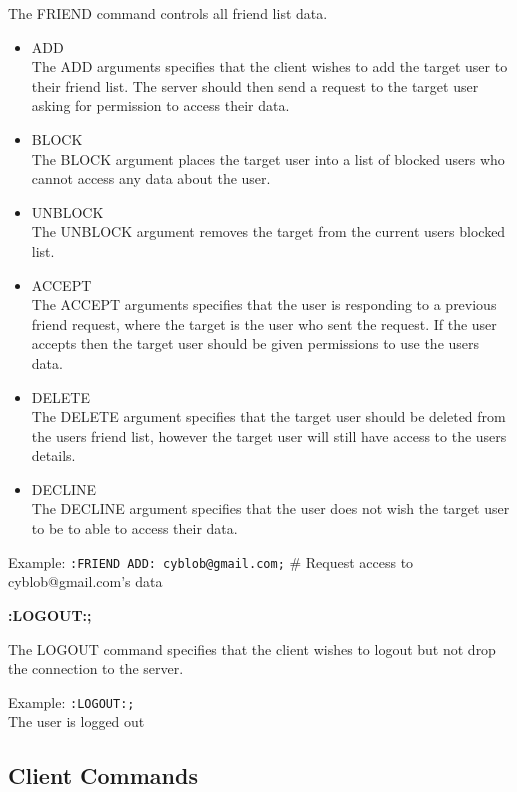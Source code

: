 The FRIEND command controls all friend list data.

\begin{itemize}

\item{ADD \\
The ADD arguments specifies that the client wishes to add the target user to their friend list. The server should then send a request to the target user asking for permission to access their data.}

\item{BLOCK \\
The BLOCK argument places the target user into a list of blocked users who cannot access any data about the user.}

\item{UNBLOCK \\
The UNBLOCK argument removes the target from the current users blocked list.}

\item{ACCEPT \\
The ACCEPT arguments specifies that the user is responding to a previous friend request, where the target is the user who sent the request. If the user accepts then the target user should be given permissions to use the users data.}

\item{DELETE \\
The DELETE  argument specifies that the target user should be deleted from the users friend list, however the target user will still have access to the users details.}

\item{DECLINE \\
The DECLINE argument specifies that the user does not wish the target user to be to able to access their data.}

\end{itemize}

Example:
\texttt{:FRIEND ADD: cyblob@gmail.com;}	# Request access to cyblob@gmail.com’s data

{\bf :LOGOUT:;}

The LOGOUT command specifies that the client wishes to logout but not drop the connection to the server.

Example:
\texttt{:LOGOUT:;}\\
The user is logged out

\subsection{Client Commands}

